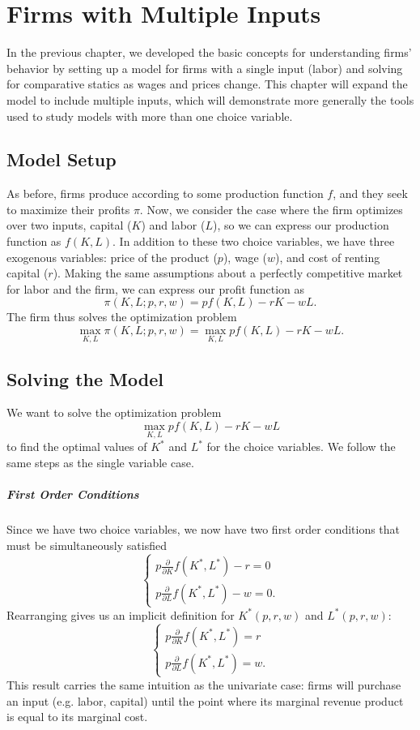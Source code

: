 \chapter{Firms with Multiple Inputs}

In the previous chapter, we developed the basic concepts for understanding firms' behavior by setting up a model for firms with a single input (labor) and solving for comparative statics as wages and prices change. This chapter will expand the model to include multiple inputs, which will demonstrate more generally the tools used to study models with more than one choice variable.

\section{Model Setup}

As before, firms produce according to some production function $f$, and they seek to maximize their profits $\pi$. Now, we consider the case where the firm optimizes over two inputs, capital ($K$) and labor ($L$), so we can express our production function as $f(K, L)$. In addition to these two choice variables, we have three exogenous variables: price of the product ($p$), wage ($w$), and cost of renting capital ($r$). Making the same assumptions about a perfectly competitive market for labor and the firm, we can express our profit function as 
$$\pi(K, L; p, r, w) = pf(K, L) - rK - wL.$$
The firm thus solves the optimization problem
$$\max_{K, L} \pi(K, L; p, r, w) = \max_{K, L} pf(K, L) - rK - wL.$$

\section{Solving the Model}

We want to solve the optimization problem 
$$\max_{K, L} pf(K, L) - rK - wL$$
to find the optimal values of $K^*$ and $L^*$ for the choice variables. We follow the same steps as the single variable case.

\paragraph{First Order Conditions}

Since we have two choice variables, we now have two first order conditions that must be simultaneously satisfied
$$\begin{cases}
p \frac{\partial}{\partial K} f\left(K^{*}, L^{*}\right)-r=0 \\
p \frac{\partial}{\partial L} f\left(K^{*}, L^{*}\right)-w=0.
\end{cases}$$
Rearranging gives us an implicit definition for $K^*(p, r, w)$ and $L^*(p, r, w)$:
$$\boxed{\begin{cases}
p \frac{\partial}{\partial K} f\left(K^{*}, L^{*}\right) = r \\
p \frac{\partial}{\partial L} f\left(K^{*}, L^{*}\right) = w.
\end{cases}}$$
This result carries the same intuition as the univariate case: firms will purchase an input (e.g. labor, capital) until the point where its marginal revenue product is equal to its marginal cost. 

